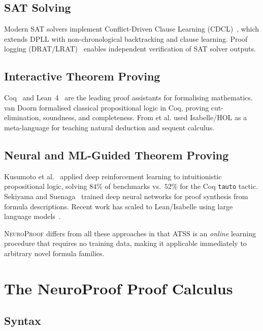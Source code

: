 \documentclass[conference]{IEEEtran}
\newcommand{\NP}{\textsc{NeuroProof}}
\newcommand{\ATSS}{\textsc{ATSS}}
\begin{document}
\subsection{SAT Solving}

Modern SAT solvers implement Conflict-Driven Clause Learning
(CDCL)~\cite{Marques-Silva1999,EenSorensson2003}, which extends DPLL with
non-chronological backtracking and clause learning.  Proof logging
(DRAT/LRAT)~\cite{HeuleHuntMahmoud2017,GochtNordstrom2022} enables independent
verification of SAT solver outputs.

\subsection{Interactive Theorem Proving}

Coq~\cite{CoqDevelopmentTeam2024} and Lean~4~\cite{MouraKong2021} are the
leading proof assistants for formalising mathematics.  van Doorn
\cite{vanDoorn2015} formalised classical propositional logic in Coq,
proving cut-elimination, soundness, and completeness.  From et al.
\cite{FromVilladsen2020} used Isabelle/HOL as a meta-language for teaching
natural deduction and sequent calculus.

\subsection{Neural and ML-Guided Theorem Proving}

Kusumoto et al.~\cite{KusumoYahata2018} applied deep reinforcement learning to
intuitionistic propositional logic, solving $84\%$ of benchmarks vs.\ $52\%$
for the Coq \texttt{tauto} tactic.  Sekiyama and Suenaga~\cite{SekiyamaSuenaga2018}
trained deep neural networks for proof synthesis from formula descriptions.
Recent work has scaled to Lean/Isabelle using large language
models~\cite{SongYangAnandkumar2024,DeepSeekProver2024,LiSurvey2024,
AnLLM2024,ZhaoSubgoalXL2024}.

\NP{} differs from all these approaches in that \ATSS{} is an \emph{online}
learning procedure that requires no training data, making it applicable
immediately to arbitrary novel formula families.

\section{The NeuroProof Proof Calculus}
\label{sec:system}

\subsection{Syntax}
\end{document}
